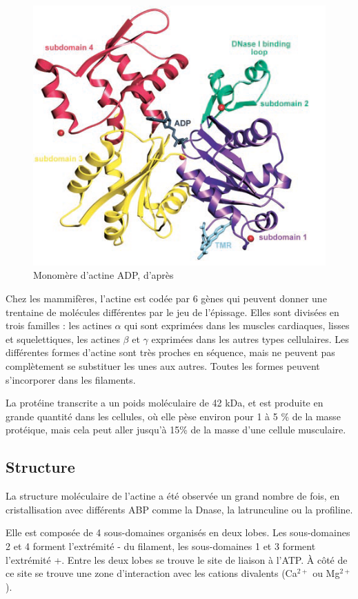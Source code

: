 \documentclass{report}
\begin{document}
\begin{figure}
\includegraphics[scale=0.7]{Actine_dominguez.png}
\caption{Monomère d'actine ADP, d'après \cite{otterbein_crystal_2001}}
\end{figure}

Chez les mammifères, l'actine est codée par 6 gènes qui peuvent donner une trentaine de molécules différentes par le jeu de l'épissage. 
Elles sont divisées en trois familles : les actines $\alpha$ qui sont exprimées dans les muscles cardiaques, lisses et squelettiques, les actines $\beta$ et $\gamma$ exprimées dans les autres types cellulaires.
Les différentes formes d'actine sont très proches en séquence, mais ne peuvent pas complètement se substituer les unes aux autres. Toutes les formes peuvent s'incorporer dans les filaments. 

La protéine transcrite a un poids moléculaire de 42 kDa, et est produite en grande quantité dans les cellules, où elle pèse environ pour 1 à 5 \% de la masse protéique, mais cela peut aller jusqu'à 15\% de la masse d'une cellule musculaire. 

\subsection{Structure}
La structure moléculaire de l'actine a été observée un grand nombre de fois, en cristallisation avec différents ABP comme la Dnase, la latrunculine ou la profiline. 

Elle est composée de 4 sous-domaines organisés en deux lobes. Les sous-domaines 2 et 4 forment l'extrémité - du filament, les sous-domaines 1 et 3 forment l'extrémité +. Entre les deux lobes se trouve le site de liaison à l'ATP. 
À côté de ce site se trouve une zone d'interaction avec les cations divalents (Ca$^{2+}$ ou Mg$^{2+}$). 
\end{document}
